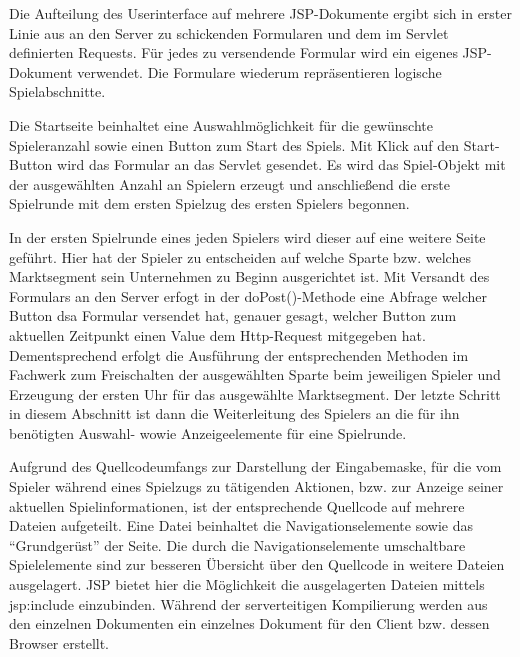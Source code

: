 Die Aufteilung des Userinterface auf mehrere JSP-Dokumente ergibt sich in erster Linie aus an den Server zu schickenden Formularen und dem im Servlet definierten Requests. Für jedes zu versendende Formular wird ein eigenes JSP-Dokument verwendet. Die Formulare wiederum repräsentieren logische Spielabschnitte.

Die Startseite beinhaltet eine Auswahlmöglichkeit für die gewünschte Spieleranzahl sowie einen Button zum Start des Spiels. Mit Klick auf den Start-Button wird das Formular an das Servlet gesendet. Es wird das Spiel-Objekt mit der ausgewählten Anzahl an Spielern erzeugt und anschließend die erste Spielrunde mit dem ersten Spielzug des ersten Spielers begonnen.

In der ersten Spielrunde eines jeden Spielers wird dieser auf eine weitere Seite geführt. Hier hat der Spieler zu entscheiden auf welche Sparte bzw. welches Marktsegment sein Unternehmen zu Beginn ausgerichtet ist. Mit Versandt des Formulars an den Server erfogt in der doPost()-Methode eine Abfrage welcher Button dsa Formular versendet hat, genauer gesagt, welcher Button zum aktuellen Zeitpunkt einen Value dem Http-Request mitgegeben hat. Dementsprechend erfolgt die Ausführung der entsprechenden Methoden im Fachwerk zum Freischalten der ausgewählten Sparte beim jeweiligen Spieler und Erzeugung der ersten Uhr für das ausgewählte Marktsegment. Der letzte Schritt in diesem Abschnitt ist dann die Weiterleitung des Spielers an die für ihn benötigten Auswahl- wowie Anzeigeelemente für eine Spielrunde.

Aufgrund des Quellcodeumfangs zur Darstellung der Eingabemaske, für die vom Spieler während eines Spielzugs zu tätigenden Aktionen, bzw. zur Anzeige seiner aktuellen Spielinformationen, ist der entsprechende Quellcode auf mehrere Dateien aufgeteilt. Eine Datei beinhaltet die Navigationselemente sowie das \enquote{Grundgerüst} der Seite. Die durch die Navigationselemente umschaltbare Spielelemente sind zur besseren Übersicht über den Quellcode in weitere Dateien ausgelagert. JSP bietet hier die Möglichkeit die ausgelagerten Dateien mittels jsp:include einzubinden. Während der serverteitigen Kompilierung werden aus den einzelnen Dokumenten ein einzelnes Dokument für den Client bzw. dessen Browser erstellt. 

